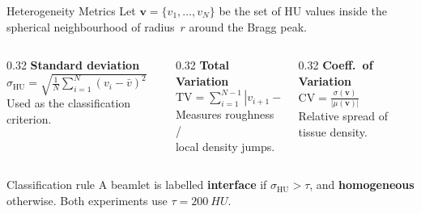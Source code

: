 \documentclass[aspectratio=169, 10pt]{beamer}
\begin{document}
\begin{frame}{Heterogeneity Metrics}
  Let $\mathbf{v} = \{v_1, \ldots, v_N\}$ be the set of HU values inside the
  spherical neighbourhood of radius~$r$ around the Bragg peak.

  \vspace{8pt}
  \begin{columns}[T]
    \begin{column}{0.32\textwidth}
      \centering
      \textbf{Standard deviation}\\[4pt]
      $\displaystyle \sigma_{\text{HU}} = \sqrt{\frac{1}{N}\sum_{i=1}^{N}(v_i - \bar{v})^2}$
      \\[6pt]
      {\small Used as the classification criterion.}
    \end{column}
    \begin{column}{0.32\textwidth}
      \centering
      \textbf{Total Variation}\\[4pt]
      $\displaystyle \text{TV} = \sum_{i=1}^{N-1} |v_{i+1} - v_i|$
      \\[6pt]
      {\small Measures roughness /\\local density jumps.}
    \end{column}
    \begin{column}{0.32\textwidth}
      \centering
      \textbf{Coeff.\ of Variation}\\[4pt]
      $\displaystyle \text{CV} = \frac{\sigma(\mathbf{v})}{|\mu(\mathbf{v})|}$
      \\[6pt]
      {\small Relative spread of\\tissue density.}
    \end{column}
  \end{columns}

  \vspace{10pt}
  \begin{block}{Classification rule}
    A beamlet is labelled \textbf{interface} if
    $\sigma_{\text{HU}} > \tau$, and \textbf{homogeneous} otherwise.
    Both experiments use $\tau = \SI{200}{HU}$.
  \end{block}
\end{frame}
\end{document}

